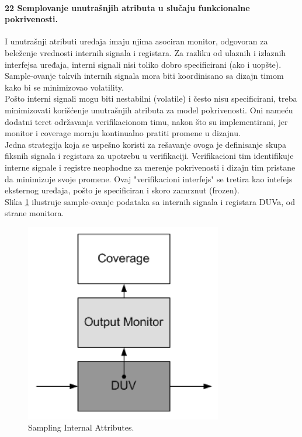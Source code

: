 \documentclass[a4paper, 12pt]{article}
\begin{document}
\paragraph{22 Semplovanje unutrašnjih atributa u slučaju funkcionalne pokrivenosti.}
\hfill \break
\indent I unutrašnji atributi uređaja imaju njima asociran monitor, odgovoran za beleženje vrednosti internih signala i registara. Za razliku od ulaznih i izlaznih interfejsa uređaja, interni signali nisi toliko dobro specificirani (ako i uopšte). Sample-ovanje takvih internih signala mora biti koordinisano sa dizajn timom kako bi se minimizovao volatility.\\
\indent Pošto interni signali mogu biti nestabilni (volatile) i često nisu specificirani, treba minimizovati korišćenje unutrašnjih atributa za model pokrivenosti. Oni nameću dodatni teret održavanja verifikacionom timu, nakon što su implementirani, jer monitor i coverage moraju kontinualno pratiti promene u dizajnu.\\
\indent Jedna strategija koja se uspešno koristi za rešavanje ovoga je definisanje skupa fiksnih signala i registara za upotrebu u verifikaciji. Verifikacioni tim identifikuje interne signale i registre neophodne za merenje pokrivenosti i dizajn tim pristane da minimizuje svoje promene. Ovaj "verifikacioni interfejs" se tretira kao intefejs eksternog uređaja, pošto je specificiran i skoro zamrznut (frozen).\\
\indent Slika \ref{img-sampling-internal-attributes} ilustruje sample-ovanje podataka sa internih signala i registara DUVa, od strane monitora.
\begin{figure}[h!]
\centering
\includegraphics[scale=0.5]{img-sampling-internal-attributes.png}
\caption{Sampling Internal Attributes.}
\label{img-sampling-internal-attributes}
\end{figure}
\end{document}
